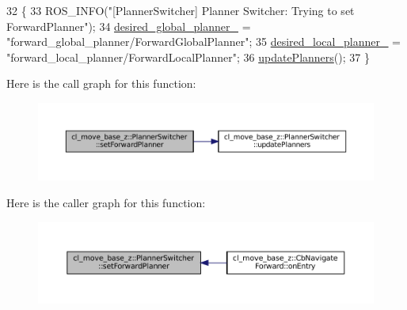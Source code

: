 \begin{DoxyCode}
32 \{
33   ROS\_INFO(\textcolor{stringliteral}{"[PlannerSwitcher] Planner Switcher: Trying to set ForwardPlanner"});
34   \hyperlink{classcl__move__base__z_1_1PlannerSwitcher_aef047d3778b2993c1df146bbad43e03d}{desired\_global\_planner\_} = \textcolor{stringliteral}{"forward\_global\_planner/ForwardGlobalPlanner"};
35   \hyperlink{classcl__move__base__z_1_1PlannerSwitcher_a6cbf65f11bb69125f913caaabdf7b4cf}{desired\_local\_planner\_} = \textcolor{stringliteral}{"forward\_local\_planner/ForwardLocalPlanner"};
36   \hyperlink{classcl__move__base__z_1_1PlannerSwitcher_a146641f63aea3185daab4c5cbb789550}{updatePlanners}();
37 \}
\end{DoxyCode}
Here is the call graph for this function\+:
\nopagebreak
\begin{figure}[H]
\begin{center}
\leavevmode
\includegraphics[width=350pt]{classcl__move__base__z_1_1PlannerSwitcher_a4bec9859c90f125f9fcc2b68594caf17_cgraph}
\end{center}
\end{figure}
Here is the caller graph for this function\+:
\nopagebreak
\begin{figure}[H]
\begin{center}
\leavevmode
\includegraphics[width=350pt]{classcl__move__base__z_1_1PlannerSwitcher_a4bec9859c90f125f9fcc2b68594caf17_icgraph}
\end{center}
\end{figure}
\mbox{\label{classcl__move__base__z_1_1PlannerSwitcher_a0accdff89d7858658c1835f06b53786f}} 
